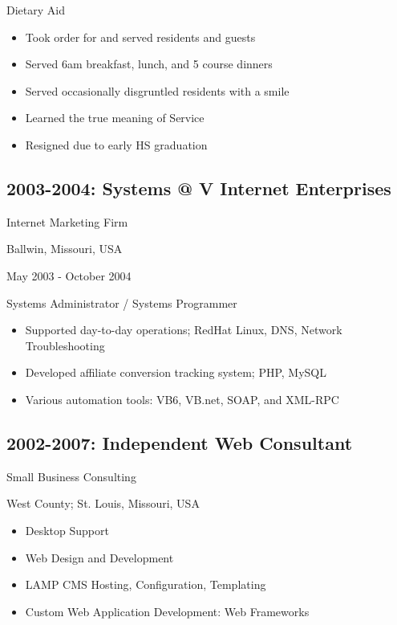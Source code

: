 \documentclass[letter,,openany,oneside,english]{sphinxhowto}
\begin{document}
Dietary Aid
\begin{itemize}
\item {} 
Took order for and served residents and guests

\item {} 
Served 6am breakfast, lunch, and 5 course dinners

\item {} 
Served occasionally disgruntled residents with a smile

\item {} 
Learned the true meaning of Service

\item {} 
Resigned due to early HS graduation

\end{itemize}


\subsection{2003-2004: Systems @ V Internet Enterprises}
\label{\detokenize{resume:systems-v-internet-enterprises}}
\begin{DUlineblock}{0em}
\item[] Internet Marketing Firm
\item[] Ballwin, Missouri, USA
\item[] May 2003 - October 2004
\end{DUlineblock}

Systems Administrator / Systems Programmer
\begin{itemize}
\item {} 
Supported day-to-day operations; RedHat Linux, DNS, Network Troubleshooting

\item {} 
Developed affiliate conversion tracking system; PHP, MySQL

\item {} 
Various automation tools: VB6, VB.net, SOAP, and XML-RPC

\end{itemize}


\subsection{2002-2007: Independent Web Consultant}
\label{\detokenize{resume:independent-web-consultant}}
\begin{DUlineblock}{0em}
\item[] Small Business Consulting
\item[] West County; St. Louis, Missouri, USA
\end{DUlineblock}
\begin{itemize}
\item {} 
Desktop Support

\item {} 
Web Design and Development

\item {} 
LAMP CMS Hosting, Configuration, Templating

\item {} 
Custom Web Application Development: Web Frameworks

\end{itemize}
\end{document}
